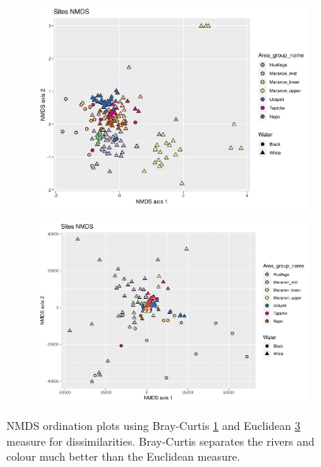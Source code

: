\begin{figure}[h]
	\centering
	\begin{subfigure}{0.45\textwidth}
		\includegraphics[width=\textwidth]{nmdsotu12}
		\caption{}
		\label{fig:nmds}
	\end{subfigure}
	\begin{subfigure}{0.45\textwidth}
		\includegraphics[width=\textwidth]{nmdsotu12euc}
		\caption{}
		\label{fig:nmdseuc}
	\end{subfigure}
\caption{NMDS ordination plots using Bray-Curtis \ref{fig:nmds} and Euclidean \ref{fig:nmdseuc} measure for dissimilarities. Bray-Curtis separates the rivers and colour much better than the Euclidean measure.}
\end{figure} 


